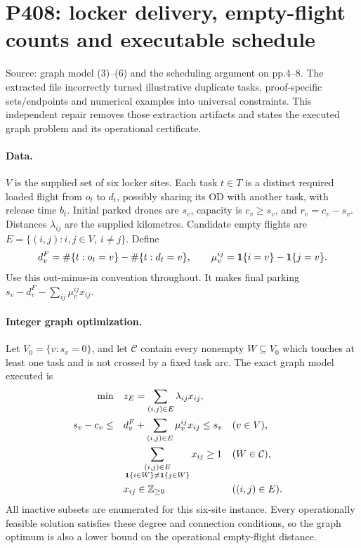 \documentclass[11pt]{article}
\begin{document}
\section*{P408: locker delivery, empty-flight counts and executable schedule}
Source: graph model (3)--(6) and the scheduling argument on pp.4--8.
The extracted file incorrectly turned illustrative duplicate tasks,
proof-specific sets/endpoints and numerical examples into universal
constraints. This independent repair removes those extraction artifacts
and states the executed graph problem and its operational certificate.

\paragraph{Data.}
$V$ is the supplied set of six locker sites.
Each task $t\in T$ is a distinct required loaded flight from $o_t$ to $d_t$,
possibly sharing its OD with another task, with release time $b_t$.
Initial parked drones are $s_v$, capacity is $c_v\ge s_v$, and
$r_v=c_v-s_v$. Distances $\lambda_{ij}$ are the supplied kilometres.
Candidate empty flights are $E=\{(i,j):i,j\in V,\ i\ne j\}$.
Define
\[
d_v^F=\#\{t:o_t=v\}-\#\{t:d_t=v\},\qquad
\mu_v^{ij}={\bf1}\{i=v\}-{\bf1}\{j=v\}.
\]
Use this out-minus-in convention throughout. It makes final parking
$s_v-d_v^F-\sum_{ij}\mu_v^{ij}x_{ij}$.

\paragraph{Integer graph optimization.}
Let $V_0=\{v:s_v=0\}$, and let $\mathcal C$ contain every nonempty
$W\subseteq V_0$ which touches at least one task and is not crossed by a
fixed task arc. The exact graph model executed is
\begin{align}
\min\quad & z_E=\sum_{(i,j)\in E}\lambda_{ij}x_{ij},\\
s_v-c_v \le\quad &d_v^F+\sum_{(i,j)\in E}\mu_v^{ij}x_{ij}\le s_v
 &&(v\in V),\\
&\sum_{\substack{(i,j)\in E\\{\bf1}\{i\in W\}\ne{\bf1}\{j\in W\}}}
x_{ij}\ge1 &&(W\in\mathcal C),\\
&x_{ij}\in\mathbb Z_{\ge0} &&((i,j)\in E).
\end{align}
All inactive subsets are enumerated for this six-site instance.
Every operationally feasible solution satisfies these degree and connection
conditions, so the graph optimum is also a lower bound on the operational
empty-flight distance.
\end{document}
